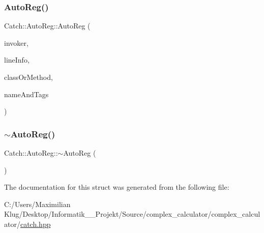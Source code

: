 \subsubsection{\texorpdfstring{Auto\+Reg()}{AutoReg()}}
{\footnotesize\ttfamily Catch\+::\+Auto\+Reg\+::\+Auto\+Reg (\begin{DoxyParamCaption}\item[{\mbox{\hyperlink{struct_catch_1_1_i_test_invoker}{I\+Test\+Invoker}} $\ast$}]{invoker,  }\item[{\mbox{\hyperlink{struct_catch_1_1_source_line_info}{Source\+Line\+Info}} const \&}]{line\+Info,  }\item[{\mbox{\hyperlink{class_catch_1_1_string_ref}{String\+Ref}} const \&}]{class\+Or\+Method,  }\item[{\mbox{\hyperlink{struct_catch_1_1_name_and_tags}{Name\+And\+Tags}} const \&}]{name\+And\+Tags }\end{DoxyParamCaption})\hspace{0.3cm}{\ttfamily [noexcept]}}

\mbox{\label{struct_catch_1_1_auto_reg_a3cdb53f1e5ff115310f3372bebe198f1}} 
\subsubsection{\texorpdfstring{$\sim$\+Auto\+Reg()}{~AutoReg()}}
{\footnotesize\ttfamily Catch\+::\+Auto\+Reg\+::$\sim$\+Auto\+Reg (\begin{DoxyParamCaption}{ }\end{DoxyParamCaption})}



The documentation for this struct was generated from the following file\+:\begin{DoxyCompactItemize}
\item 
C\+:/\+Users/\+Maximilian Klug/\+Desktop/\+Informatik\+\_\+\_\+\+Projekt/\+Source/complex\+\_\+calculator/complex\+\_\+calculator/\mbox{\hyperlink{catch_8hpp}{catch.\+hpp}}\end{DoxyCompactItemize}

